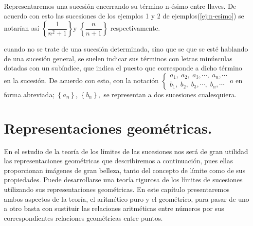 \singlespace

\notacion Representaremos una sucesión encerrando su término n-ésimo
entre llaves. De acuerdo con esto las sucesiones de los ejemplos 1
y 2 de ejemplos(\ref{ej:n-esimo}) se notarían así $\left\{ \dfrac{1}{n^{2}+1}\right\} $y
$\left\{ \dfrac{n}{n+1}\right\} $ respectivamente.

cuando no se trate de una sucesión determinada, sino que se que se
esté hablando de una sucesión general, se suelen indicar sus términos
con letras minúsculas dotadas con un subíndice, que indica el puesto
que corresponde a dicho término en la sucesión. De acuerdo con esto,
con la notación $\left\{ \begin{array}{c}
a_{1},\;a_{2},\;a_{3},\cdots,\;a_{n},\cdots\\
b_{1},\;b_{2},\;b_{3},\cdots,\;b_{n},\cdots
\end{array}\right.$o en forma abreviada; $\left\{ a_{n}\right\} $, $\left\{ b_{n}\right\} ,$
se representan a dos sucesiones cualesquiera.

\section{Representaciones geométricas.}

En el estudio de la teoría de los límites de las sucesiones nos será
de gran utilidad las representaciones geométricas que describiremos
a continuación, pues ellas proporcionan imágenes de gran belleza,
tanto del concepto de límite como de sus propiedades. Puede desarrollarse
una teoría rigurosa de los límites de sucesiones utilizando sus representaciones
geométricas. En este capítulo presentaremos ambos aspectos de la teoría,
el aritmético puro y el geométrico, para pasar de uno a otro basta
con sustituir las relaciones aritméticas entre números por sus correspondientes
relaciones geométricas entre puntos.

